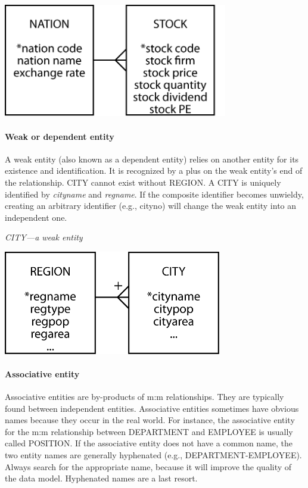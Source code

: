 \documentclass[
]{article}
\begin{document}
\includegraphics[width=3.85417in,height=\textheight]{Figures/Chapter 4/nation-stock.png}

\hypertarget{weak-or-dependent-entity}{%
\paragraph*{Weak or dependent entity}\label{weak-or-dependent-entity}}

A weak entity (also known as a dependent entity) relies on another
entity for its existence and identification. It is recognized by a plus
on the weak entity's end of the relationship. CITY cannot exist without
REGION. A CITY is uniquely identified by \emph{cityname} and \emph{regname}. If
the composite identifier becomes unwieldy, creating an arbitrary
identifier (e.g., cityno) will change the weak entity into an
independent one.

\emph{CITY---a weak entity}

\includegraphics[width=3.75in,height=\textheight]{Figures/Chapter 7/region-city.png}

\hypertarget{associative-entity}{%
\paragraph*{Associative entity}\label{associative-entity}}

Associative entities are by-products of m:m relationships. They are
typically found between independent entities. Associative entities
sometimes have obvious names because they occur in the real world. For
instance, the associative entity for the m:m relationship between
DEPARTMENT and EMPLOYEE is usually called POSITION. If the associative
entity does not have a common name, the two entity names are generally
hyphenated (e.g., DEPARTMENT-EMPLOYEE). Always search for the
appropriate name, because it will improve the quality of the data model.
Hyphenated names are a last resort.
\end{document}
